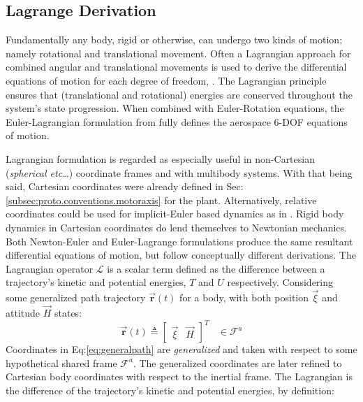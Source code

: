 \subsection{Lagrange Derivation}
\label{subsec:dynamics.rigidbody.lagrange}
Fundamentally any body, rigid or otherwise, can undergo two kinds of motion; namely rotational and translational movement. Often a Lagrangian approach for combined angular and translational movements is used to derive the differential equations of motion for each degree of freedom, \cite{classicaldynamics}. The Lagrangian principle ensures that (translational and rotational) energies are conserved throughout the system's state progression. When combined with Euler-Rotation equations, the Euler-Lagrangian formulation from \cite{lagrange-formalism} fully defines the aerospace 6-DOF equations of motion.
\par
Lagrangian formulation is regarded as especially useful in non-Cartesian (\emph{spherical etc\ldots}) coordinate frames and with multibody systems. With that being said, Cartesian coordinates were already defined in Sec:\ref{subsec:proto.conventions.motoraxis} for the plant. Alternatively, relative coordinates could be used for implicit-Euler based dynamics as in \cite{autonomousrobotseuler}. Rigid body dynamics in Cartesian coordinates do lend themselves to Newtonian mechanics. Both Newton-Euler and Euler-Lagrange formulations produce the same resultant differential equations of motion, but follow conceptually different derivations. The Lagrangian operator $\mathcal{L}$ is a scalar term defined as the difference between a trajectory's kinetic and potential energies, $T$ and $U$ respectively. Considering some generalized path trajectory $\vec{\mathbf{r}}(t)$ for a body, with both position $\vec{\xi}$ and attitude $\vec{H}$ states:
\begin{equation}\label{eq:generalpath}
\vec{\mathbf{r}}(t)\triangleq\begin{bmatrix}
\vec{\xi} & \vec{H}
\end{bmatrix}^T~~~~\in\mathcal{F}^{a}
\end{equation}
Coordinates in Eq:\ref{eq:generalpath} are \emph{generalized} and taken with respect to some hypothetical shared frame $\mathcal{F}^{a}$. The generalized coordinates are later refined to Cartesian body coordinates with respect to the inertial frame. The Lagrangian is the difference of the trajectory's kinetic and potential energies, by definition:
